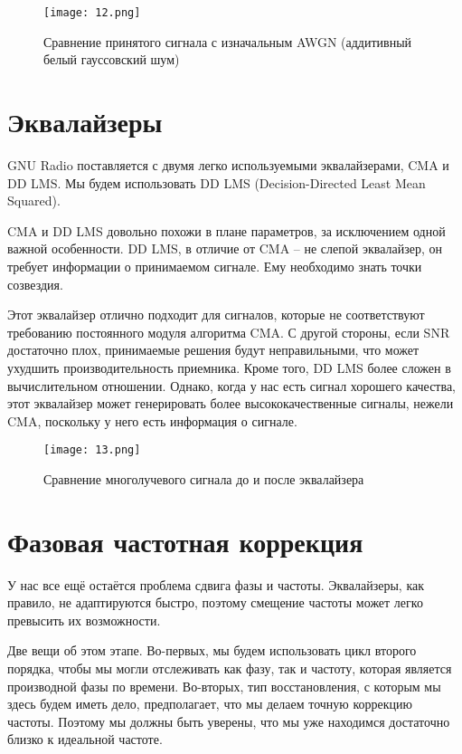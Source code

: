 \documentclass[a4paper,12pt]{report}
\begin{document}
\begin{figure}[H]
        \centering
        \texttt{[image: 12.png]}
        \caption{Сравнение принятого сигнала с изначальным AWGN (аддитивный белый гауссовский шум)}
        \label{fig:ig4_1}
\end{figure}

\section{Эквалайзеры}

GNU Radio поставляется с двумя легко используемыми эквалайзерами, CMA и DD LMS. Мы будем использовать DD LMS (Decision-Directed Least Mean Squared). 

CMA и DD LMS довольно похожи в плане параметров, за исключением одной важной особенности. DD LMS, в отличие от CMA – не слепой эквалайзер, он требует информации о принимаемом сигнале. Ему необходимо знать точки созвездия. 

Этот эквалайзер отлично подходит для сигналов, которые не соответствуют требованию постоянного модуля алгоритма CMA. С другой стороны, если SNR достаточно плох, принимаемые решения будут неправильными, что может ухудшить производительность приемника. Кроме того, DD LMS более сложен в вычислительном отношении. Однако, когда у нас есть сигнал хорошего качества, этот эквалайзер может генерировать более высококачественные сигналы, нежели CMA, поскольку у него есть информация о сигнале. 

\begin{figure}[H]
        \centering
        \texttt{[image: 13.png]}
        \caption{Сравнение многолучевого сигнала до и после эквалайзера}
        \label{fig:ig4_1}
\end{figure}

\section{Фазовая частотная коррекция }

У нас все ещё остаётся проблема сдвига фазы и частоты. Эквалайзеры, как правило, не адаптируются быстро, поэтому смещение частоты может легко превысить их возможности. 

Две вещи об этом этапе. Во-первых, мы будем использовать цикл второго порядка, чтобы мы могли отслеживать как фазу, так и частоту, которая является производной фазы по времени. Во-вторых, тип восстановления, с которым мы здесь будем иметь дело, предполагает, что мы делаем точную коррекцию частоты. Поэтому мы должны быть уверены, что мы уже находимся достаточно близко к идеальной частоте. 
\end{document}
